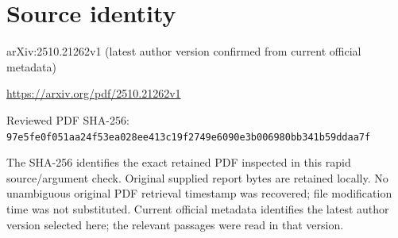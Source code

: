 \documentclass[11pt]{article}
\begin{document}
\section*{Source identity}

arXiv:2510.21262v1 (latest author version confirmed from current official metadata)

\url{https://arxiv.org/pdf/2510.21262v1}

Reviewed PDF SHA-256: \nolinkurl{97e5fe0f051aa24f53ea028ee413c19f2749e6090e3b006980bb341b59ddaa7f}

The SHA-256 identifies the exact retained PDF inspected in this rapid source/argument check. Original supplied report bytes are retained locally. No unambiguous original PDF retrieval timestamp was recovered; file modification time was not substituted. Current official metadata identifies the latest author version selected here; the relevant passages were read in that version.
\end{document}
